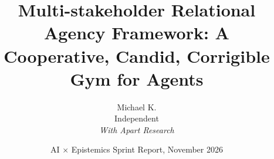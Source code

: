 \documentclass[10pt]{article}
\title{Multi-stakeholder Relational Agency Framework: A Cooperative, Candid, Corrigible Gym for Agents}
\author{Michael K.\\Independent\\[0.3em]\textit{With Apart Research}}
\date{AI $\times$ Epistemics Sprint Report, November 2026}
\begin{document}
\maketitle

\begin{abstract}

\end{abstract}











\appendix

\end{document}
